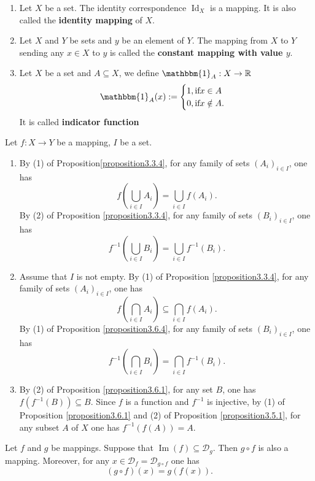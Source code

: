 \documentclass{book}
\numberwithin{equation}{section}
\begin{document}
\begin{exampleenv}
    \quad
    \begin{enumerate}
    \item Let \( X \) be a set. The identity correspondence \( \operatorname{Id}_X \) is a mapping. It is also called the \textbf{identity mapping} of \( X \).
    \item Let \( X \) and \( Y \) be sets and \( y \) be an element of \( Y \). The mapping from \( X \) to \( Y \) sending any \( x \in X \) to \( y \) is called the \textbf{constant mapping with value \( y \)}.
    \item Let $X$ be a set and $A\subseteq X$,  we define $\mathbbm{1}_A:X\rightarrow \mathbb{R}$   
    $$\mathbbm{1}_A(x):=\begin{cases}
 1,  \text{if}\space x \in A \\0, \text{if}\space x \notin A.

\end{cases}$$ 
It is called \textbf{indicator function}
\end{enumerate}
\end{exampleenv}


\begin{remark}
   Let \( f: X \to Y \) be a mapping,  \( I \) be a set.
\begin{enumerate}
    \item By (1) of Proposition\ref{proposition3.3.4},  for any family of sets \( (A_i)_{i \in I} \),  one has
    \[
    f\left(\bigcup_{i \in I} A_i\right) = \bigcup_{i \in I} f(A_i).
    \]
    By (2) of Proposition \ref{proposition3.3.4},  for any family of sets \( (B_i)_{i \in I} \),  one has
    \[
    f^{-1}\left(\bigcup_{i \in I} B_i\right) = \bigcup_{i \in I} f^{-1}(B_i).
    \]
    \item Assume that \( I \) is not empty. By (1) of Proposition \ref{proposition3.3.4},  for any family of sets \( (A_i)_{i \in I} \),  one has
    \[
    f\left(\bigcap_{i \in I} A_i\right) \subseteq \bigcap_{i \in I} f(A_i).
    \]
    By (1) of Proposition \ref{proposition3.6.4},  for any family of sets \( (B_i)_{i \in I} \),  one has
    \[
    f^{-1}\left(\bigcap_{i \in I} B_i\right) = \bigcap_{i \in I} f^{-1}(B_i).
    \]
    \item By (2) of Proposition \ref{proposition3.6.1},  for any set \( B \),  one has \( f(f^{-1}(B)) \subseteq B \). Since \( f \) is a function and \( f^{-1} \) is injective,  by (1) of Proposition \ref{proposition3.6.1} and (2) of Proposition \ref{proposition3.5.1},  for any subset \( A \) of \( X \) one has \( f^{-1}(f(A)) = A \).
\end{enumerate}

 
\end{remark}
\begin{propositionenv}\label{proposition3.7.1}
    Let \( f \) and \( g \) be mappings. Suppose that \( \operatorname{Im}(f) \subseteq \mathscr{D}_g \). Then \( g \circ f \) is also a mapping. Moreover,  for any \( x \in \mathscr{D}_f = \mathscr{D}_{g \circ f} \) one has
\[
(g \circ f)(x) = g(f(x)).
\]

\end{propositionenv}
\end{document}
